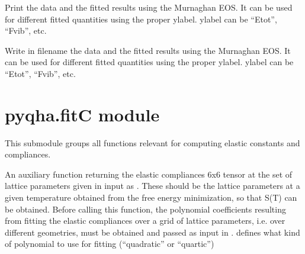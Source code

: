 \documentclass[letterpaper,10pt,english]{sphinxmanual}
\begin{document}

\begin{fulllineitems}
\label{pyqha:pyqha.eos.print_eos_data}
Print the data and the fitted results using the Murnaghan EOS. It can be used for
different fitted quantities using the proper ylabel. ylabel can be ``Etot'', 
``Fvib'', etc.

\end{fulllineitems}


\begin{fulllineitems}
\label{pyqha:pyqha.eos.write_Etotfitted}
Write in filename the data and the fitted results using the Murnaghan EOS. It can be used for
different fitted quantities using the proper ylabel. ylabel can be ``Etot'', 
``Fvib'', etc.

\end{fulllineitems}



\section{pyqha.fitC module}
\label{pyqha:pyqha-fitc-module}\label{pyqha:module-pyqha.fitC}
This submodule groups all functions relevant for computing elastic constants and
compliances.

\begin{fulllineitems}
An auxiliary function returning the elastic compliances 6x6 tensor at the
set of lattice parameters given in input as . These should be the
lattice parameters at a given temperature obtained from the free energy
minimization, so that S(T) can be obtained.
Before calling this function, the polynomial coefficients resulting from 
fitting the elastic compliances over a grid of lattice parameters, i.e. over
different geometries, must be obtained and passed as input in . 
 defines what kind of polynomial to use for fitting (``quadratic'' or
``quartic'')

\end{fulllineitems}
\end{document}
